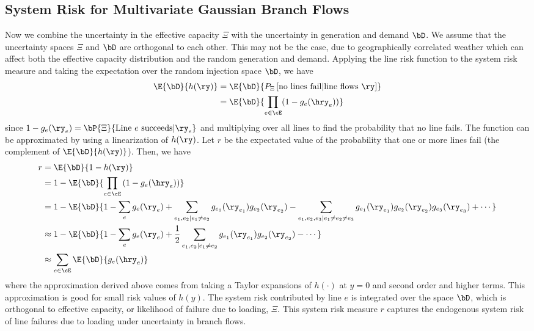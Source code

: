 \subsection{System Risk for Multivariate Gaussian Branch Flows}
Now we combine the uncertainty in the effective capacity $\Xi$ with the uncertainty in generation and demand $\bD$.  We assume that the uncertainty spaces $\Xi$ and $\bD$ are orthogonal to each other.  This may not be the case, due to geographically correlated weather which can affect both the effective capacity distribution and the random generation and demand.  Applying the line risk function  to the system risk measure  and taking the expectation over the random injection space $\bD$, we have
\begin{align}\label{nofailuncertainty}
  \E{\bD}{h(\ry)}  &= \E{\bD}{P_\Xi \left[ \mbox{no lines fail} | \mbox{line flows } \ry\right]}\\
  &= \E{\bD}{ \prod_{e \in \cE} (1 - g_e(\hry_e) )}
\end{align}
since $ 1- g_e(\ry_e) = \bP{\Xi}{\text{Line }e\text{ succeeds} | \ry_e} $ and multiplying over all lines to find the probability that no line fails. The function  can be approximated by using a linearization of $h(\ry)$.  Let $r$ be the expectated value of the probability that one or more lines fail (the complement of $\E{\bD}{h(\ry)}$). Then, we have
\begin{align*}\label{linear}
r &= \E{\bD}{1 - h(\ry)}  \\
 &= 1 - \E{\bD}{\prod_{e \in \cE}\left( 1 - g_e(\hry_e)\right) } \\
  &= 1 - \E{\bD}{ 1 - \sum_e g_e(\ry_e) + \sum_{e_1,e_2|e_1\neq e_2} g_{e_1} (\ry_{e_1}) g_{e_2}(\ry_{e_2}) - \sum_{e_1,e_2,e_3|e_1\neq e_2 \neq e_3} g_{e_1} (\ry_{e_1}) g_{e_2}(\ry_{e_2}) g_{e_3} (\ry_{e_3}) + \cdots } \\
  & \approx 1 - \E{\bD}{ 1 - \sum_{e} g_e(\ry_e) + \frac{1}{2} \sum_{e_1,e_2|e_1\neq e_2} g_{e_1} (\ry_{e_1}) g_{e_2}(\ry_{e_2}) - \cdots } \\
 &\approx \sum_{e \in \cE} \E{\bD}{g_e(\hry_e)}
\end{align*}
where the approximation derived above comes from taking a Taylor expansions of $h(\cdot)$ at $y=0$ and second order and higher terms.  This approximation is good for small risk values of $h(y)$.
The system risk contributed by line $e$ is integrated over the space $\bD$, which is orthogonal to effective capacity, or likelihood of failure due to loading, $\Xi$.  This system risk measure $r$ captures the endogenous system risk of line failures due to loading under uncertainty in branch flows.

